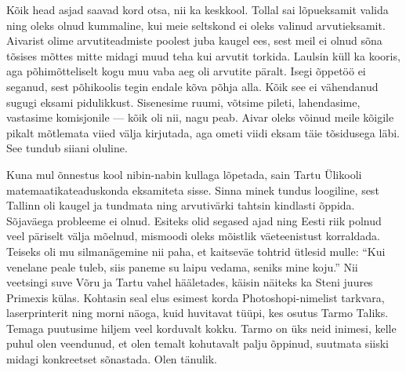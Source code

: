 Kõik head asjad saavad kord otsa, nii ka keskkool. Tollal sai lõpueksamit valida ning oleks olnud kummaline, kui meie 
seltskond ei oleks valinud arvutieksamit. Aivarist olime arvutiteadmiste poolest juba kaugel 
ees, sest meil ei olnud sõna tõsises mõttes mitte midagi muud teha kui arvutit 
torkida. Laulsin küll ka kooris, 
aga põhimõtteliselt kogu muu vaba aeg oli arvutite päralt. Isegi õppetöö ei 
seganud, sest põhikoolis tegin endale kõva põhja alla. Kõik see ei 
vähendanud sugugi eksami pidulikkust. Sisenesime ruumi, võtsime pileti, 
lahendasime, vastasime komisjonile --- kõik oli nii, nagu peab. Aivar oleks võinud 
meile kõigile pikalt mõtlemata viied välja kirjutada, aga ometi viidi eksam täie tõsidusega läbi. 
See tundub siiani oluline.

Kuna mul õnnestus kool nibin-nabin kullaga lõpetada, sain Tartu Ülikooli 
matemaatikateaduskonda eksamiteta 
sisse. Sinna minek tundus loogiline, sest Tallinn oli kaugel ja tundmata ning 
arvutivärki tahtsin kindlasti õppida. Sõjaväega probleeme ei olnud. Esiteks 
olid segased ajad ning Eesti riik polnud veel päriselt välja mõelnud, mismoodi 
oleks mõistlik väeteenistust korraldada. 
Teiseks oli mu silmanägemine nii paha, 
et kaitseväe tohtrid ütlesid mulle: \enquote{Kui venelane peale tuleb, 
siis paneme su laipu vedama, seniks mine koju.} Nii veetsingi suve Võru ja 
Tartu vahel hääletades, käisin näiteks ka Steni 
juures 
Primexis külas. Kohtasin seal elus esimest korda Photoshopi-nimelist tarkvara, laserprinterit ning morni näoga, kuid
huvitavat tüüpi, kes osutus Tarmo Taliks. Temaga puutusime
hiljem veel korduvalt kokku. Tarmo on üks neid inimesi, kelle puhul olen veendunud,
et olen temalt kohutavalt palju õppinud, suutmata siiski midagi konkreetset sõnastada. 
Olen tänulik. 

